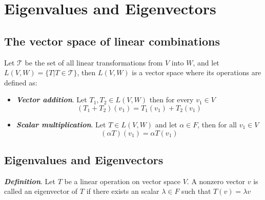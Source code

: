 \documentclass{report}
\begin{document}
    \tableofcontents

    \pagebreak
    \chapter{ Eigenvalues and Eigenvectors }

    \section{The vector space of linear combinations}

    Let $\mathcal{T}$ be the set of all linear transformations from $V$ into $W$, and let $L(V,W) = \{T| T \in \mathcal{T}\}$, then $L(V,W)$ is a vector space where its operations are defined as:

    \begin{itemize}
        \item \textit{\textbf{Vector addition}}. Let $T_1, T_2 \in L(V,W)$ then for every $v_1 \in V$
        $$(T_1+T_2)(v_1) = T_1(v_1) + T_2(v_1)$$
        \item \textit{\textbf{Scalar multiplication}}. Let $T \in L(V,W)$ and let $\alpha \in F$, then for all $v_1 \in V$
        $$(\alpha T)(v_1) = \alpha T(v_1)$$
    \end{itemize}

    \section{Eigenvalues and Eigenvectors}

    \begin{defBox}
        \textit{\textbf{Definition}}. Let $T$ be a linear operation on vector space $V$. A nonzero vector $v$ is called an eigenvector of $T$ if there exists an scalar $\lambda \in F$ such that $T(v) = \lambda v$
    \end{defBox}
\end{document}
